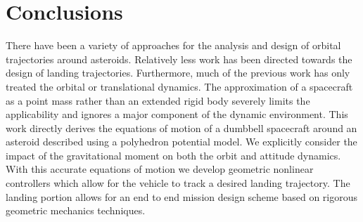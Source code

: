 \documentclass[letterpaper, paper,11pt]{AAS}		%
\begin{document}
\section{Conclusions}\label{sec:conclusions}
There have been a variety of approaches for the analysis and design of orbital trajectories around asteroids.
Relatively less work has been directed towards the design of landing trajectories.
Furthermore, much of the previous work has only treated the orbital or translational dynamics.
The approximation of a spacecraft as a point mass rather than an extended rigid body severely limits the applicability and ignores a major component of the dynamic environment.
This work directly derives the equations of motion of a dumbbell spacecraft around an asteroid described using a polyhedron potential model. 
We explicitly consider the impact of the gravitational moment on both the orbit and attitude dynamics. 
With this accurate equations of motion we develop geometric nonlinear controllers which allow for the vehicle to track a desired landing trajectory. 
The landing portion allows for an end to end mission design scheme based on rigorous geometric mechanics techniques.

 

\end{document}
